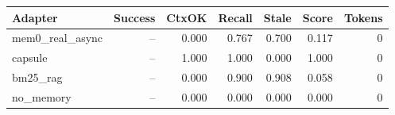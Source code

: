 \begin{tabular}{lrrrrrr}
\hline
Adapter & Success & CtxOK & Recall & Stale & Score & Tokens \\
\hline
mem0\_real\_async & -- & 0.000 & 0.767 & 0.700 & 0.117 & 0 \\
capsule & -- & 1.000 & 1.000 & 0.000 & 1.000 & 0 \\
bm25\_rag & -- & 0.000 & 0.900 & 0.908 & 0.058 & 0 \\
no\_memory & -- & 0.000 & 0.000 & 0.000 & 0.000 & 0 \\
\hline
\end{tabular}
